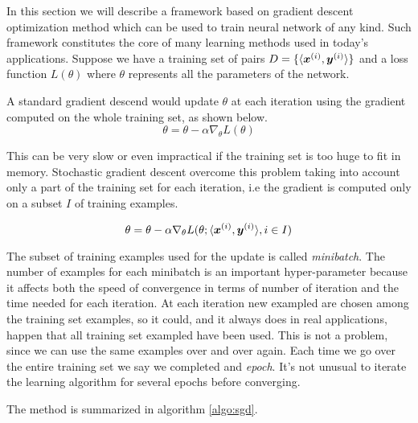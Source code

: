 In this section we will describe a framework based on gradient descent optimization method which can be used to train 
neural network of any kind. Such framework constitutes the core of many learning methods used in today's applications. 
Suppose we have a training set of pairs $D=\{\langle\boldsymbol{x}^{(i)},\boldsymbol{y}^{(i)}\rangle\}$ and a loss function $L(\theta)$ 
where $\theta$ represents all the parameters of the network.

A standard gradient descend would update $\theta$ at each iteration using the gradient computed on the whole training 
set, as shown below.
\begin{equation}
 \theta = \theta - \alpha \nabla_\theta L(\theta)
\end{equation}

This can be very slow or even impractical if the training set is too huge to fit in memory. Stochastic gradient descent 
overcome this problem taking into account only a part of the training set for each iteration, i.e the gradient is 
computed only on a subset $I$ of training examples. 

\begin{equation}
 \theta = \theta - \alpha \nabla_\theta L(\theta; \langle\boldsymbol{x}^{(i)},\boldsymbol{y}^{(i)}\rangle, i\in I)
 \label{eq:updateRule}
\end{equation}

The subset of training examples used for the update is called \textit{minibatch}. The number of examples for each 
minibatch is an important hyper-parameter because it affects both the speed of convergence in terms of number of 
iteration and the time needed for each iteration. At each iteration new exampled are chosen among the training set 
examples, so it could, and it always does in real applications, happen that all training set exampled have been used.
This is not a problem, since we can use the same examples over and over again. Each time we go over the entire training 
set we say we completed and \textit{epoch}. It's not unusual to iterate the learning algorithm for several epochs 
before converging.

The method is summarized in algorithm \ref{algo:sgd}.


